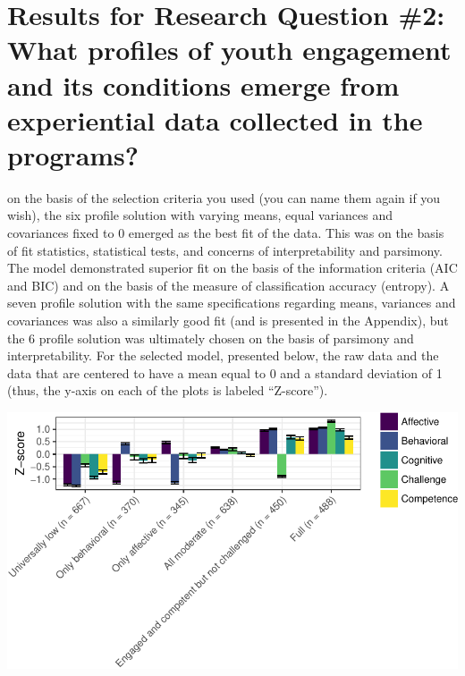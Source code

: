 \documentclass[]{book}
\theoremstyle{definition}
\theoremstyle{definition}
\theoremstyle{definition}
\theoremstyle{remark}
\begin{document}
\section{Results for Research Question \#2: What profiles of youth
engagement and its conditions emerge from experiential data collected in
the
programs?}\label{results-for-research-question-2-what-profiles-of-youth-engagement-and-its-conditions-emerge-from-experiential-data-collected-in-the-programs}

on the basis of the selection criteria you used (you can name them again
if you wish), the six profile solution with varying means, equal
variances and covariances fixed to 0 emerged as the best fit of the
data. This was on the basis of fit statistics, statistical tests, and
concerns of interpretability and parsimony. The model demonstrated
superior fit on the basis of the information criteria (AIC and BIC) and
on the basis of the measure of classification accuracy (entropy). A
seven profile solution with the same specifications regarding means,
variances and covariances was also a similarly good fit (and is
presented in the Appendix), but the 6 profile solution was ultimately
chosen on the basis of parsimony and interpretability. For the selected
model, presented below, the raw data and the data that are centered to
have a mean equal to 0 and a standard deviation of 1 (thus, the y-axis
on each of the plots is labeled ``Z-score'').

\begin{center}\includegraphics[width=1\linewidth]{rosenberg-dissertation_files/figure-latex/unnamed-chunk-10-1} \end{center}
\end{document}

